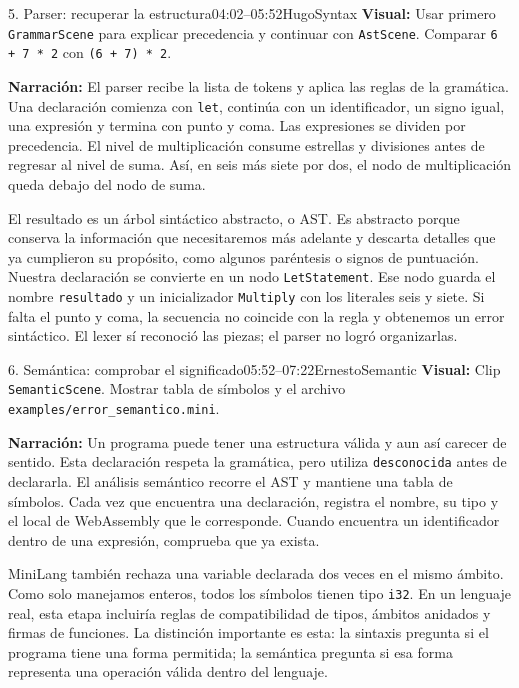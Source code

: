 \documentclass[11pt,letterpaper]{article}
\newcommand{\visual}[1]{\textbf{Visual:} #1}
\begin{document}
\begin{segmento}{5. Parser: recuperar la estructura}{04:02--05:52}{Hugo}{Syntax}
\visual{Usar primero \texttt{GrammarScene} para explicar precedencia y continuar con \texttt{AstScene}. Comparar \texttt{6 + 7 * 2} con \texttt{(6 + 7) * 2}.}

\textbf{Narración:} El parser recibe la lista de tokens y aplica las reglas de la gramática. Una declaración comienza con \texttt{let}, continúa con un identificador, un signo igual, una expresión y termina con punto y coma. Las expresiones se dividen por precedencia. El nivel de multiplicación consume estrellas y divisiones antes de regresar al nivel de suma. Así, en seis más siete por dos, el nodo de multiplicación queda debajo del nodo de suma.

El resultado es un árbol sintáctico abstracto, o AST. Es abstracto porque conserva la información que necesitaremos más adelante y descarta detalles que ya cumplieron su propósito, como algunos paréntesis o signos de puntuación. Nuestra declaración se convierte en un nodo \texttt{LetStatement}. Ese nodo guarda el nombre \texttt{resultado} y un inicializador \texttt{Multiply} con los literales seis y siete. Si falta el punto y coma, la secuencia no coincide con la regla y obtenemos un error sintáctico. El lexer sí reconoció las piezas; el parser no logró organizarlas.
\end{segmento}

\begin{segmento}{6. Semántica: comprobar el significado}{05:52--07:22}{Ernesto}{Semantic}
\visual{Clip \texttt{SemanticScene}. Mostrar tabla de símbolos y el archivo \texttt{examples/error\_semantico.mini}.}

\textbf{Narración:} Un programa puede tener una estructura válida y aun así carecer de sentido. Esta declaración respeta la gramática, pero utiliza \texttt{desconocida} antes de declararla. El análisis semántico recorre el AST y mantiene una tabla de símbolos. Cada vez que encuentra una declaración, registra el nombre, su tipo y el local de WebAssembly que le corresponde. Cuando encuentra un identificador dentro de una expresión, comprueba que ya exista.

MiniLang también rechaza una variable declarada dos veces en el mismo ámbito. Como solo manejamos enteros, todos los símbolos tienen tipo \texttt{i32}. En un lenguaje real, esta etapa incluiría reglas de compatibilidad de tipos, ámbitos anidados y firmas de funciones. La distinción importante es esta: la sintaxis pregunta si el programa tiene una forma permitida; la semántica pregunta si esa forma representa una operación válida dentro del lenguaje.
\end{segmento}
\end{document}
